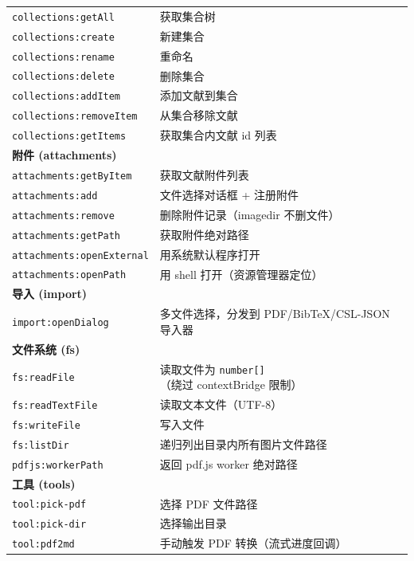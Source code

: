 \documentclass[12pt, a4paper]{article}
\begin{document}
\begin{longtable}{p{4.8cm} p{7.8cm}}
  \texttt{collections:getAll}    & 获取集合树 \\
  \texttt{collections:create}    & 新建集合 \\
  \texttt{collections:rename}    & 重命名 \\
  \texttt{collections:delete}    & 删除集合 \\
  \texttt{collections:addItem}   & 添加文献到集合 \\
  \texttt{collections:removeItem}& 从集合移除文献 \\
  \texttt{collections:getItems}  & 获取集合内文献 id 列表 \\
  \midrule
  \multicolumn{2}{l}{\textbf{附件 (attachments)}} \\
  \texttt{attachments:getByItem} & 获取文献附件列表 \\
  \texttt{attachments:add}       & 文件选择对话框 + 注册附件 \\
  \texttt{attachments:remove}    & 删除附件记录（imagedir 不删文件） \\
  \texttt{attachments:getPath}   & 获取附件绝对路径 \\
  \texttt{attachments:openExternal} & 用系统默认程序打开 \\
  \texttt{attachments:openPath}  & 用 shell 打开（资源管理器定位） \\
  \midrule
  \multicolumn{2}{l}{\textbf{导入 (import)}} \\
  \texttt{import:openDialog}     & 多文件选择，分发到 PDF/BibTeX/CSL-JSON 导入器 \\
  \midrule
  \multicolumn{2}{l}{\textbf{文件系统 (fs)}} \\
  \texttt{fs:readFile}           & 读取文件为 \texttt{number[]}（绕过 contextBridge 限制） \\
  \texttt{fs:readTextFile}       & 读取文本文件（UTF-8） \\
  \texttt{fs:writeFile}          & 写入文件 \\
  \texttt{fs:listDir}            & 递归列出目录内所有图片文件路径 \\
  \texttt{pdfjs:workerPath}      & 返回 pdf.js worker 绝对路径 \\
  \midrule
  \multicolumn{2}{l}{\textbf{工具 (tools)}} \\
  \texttt{tool:pick-pdf}         & 选择 PDF 文件路径 \\
  \texttt{tool:pick-dir}         & 选择输出目录 \\
  \texttt{tool:pdf2md}           & 手动触发 PDF 转换（流式进度回调） \\

\end{longtable}
\end{document}
